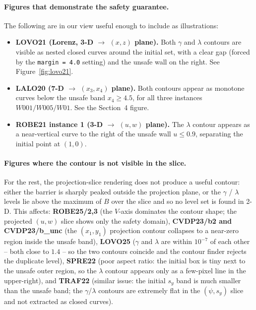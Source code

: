 \documentclass[11pt,a4paper]{article}
\begin{document}
\paragraph{Figures that demonstrate the safety guarantee.} The
following are in our view useful enough to include as illustrations:
\begin{itemize}
  \item \textbf{LOVO21 (Lorenz, 3-D $\to$ $(x, z)$ plane).} Both
        $\gamma$ and $\lambda$ contours are visible as nested closed
        curves around the initial set, with a clear gap (forced by the
        \texttt{margin = 4.0} setting) and the unsafe wall on the right.
        See Figure~\ref{fig:lovo21}.
  \item \textbf{LALO20 (7-D $\to$ $(x_3, x_4)$ plane).} Both contours
        appear as monotone curves below the unsafe band $x_4 \ge 4.5$,
        for all three instances $W001 / W005 / W01$. See the
        Section~4 figure.
  \item \textbf{ROBE21 instance 1 (3-D $\to$ $(u, w)$ plane).} The
        $\lambda$ contour appears as a near-vertical curve to the
        right of the unsafe wall $u \le 0.9$, separating the initial
        point at $(1, 0)$.
\end{itemize}

\paragraph{Figures where the contour is not visible in the slice.}
For the rest, the projection-slice rendering does not produce a
useful contour: either the barrier is sharply peaked outside the
projection plane, or the $\gamma$ / $\lambda$ levels lie above the
maximum of $B$ over the slice and so no level set is found in 2-D.
This affects: \textbf{ROBE25/2,3} (the $V$-axis dominates the contour
shape; the projected $(u, w)$ slice shows only the safety domain),
\textbf{CVDP23/b2 and CVDP23/b\_unc} (the $(x_1, y_1)$ projection
contour collapses to a near-zero region inside the unsafe band),
\textbf{LOVO25} ($\gamma$ and $\lambda$ are within $10^{-7}$ of each
other -- both close to $1.4$ -- so the two contours coincide and the
contour finder rejects the duplicate level), \textbf{SPRE22} (poor
aspect ratio: the initial box is tiny next to the unsafe outer
region, so the $\lambda$ contour appears only as a few-pixel line in
the upper-right), and \textbf{TRAF22} (similar issue: the initial
$s_y$ band is much smaller than the unsafe band; the $\gamma$/$\lambda$
contours are extremely flat in the $(\psi, s_y)$ slice and not
extracted as closed curves).
\end{document}
